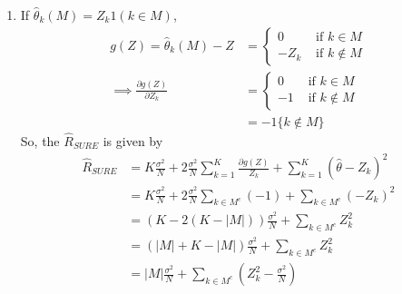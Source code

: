 \documentclass{article}[12pt]
\begin{document}
\begin{enumerate}
    \item If $\hat{\theta}_k(M) = Z_k 1 (k \in M)$,
    \begin{align*}
        g(Z) = \hat{\theta}_k(M) - Z &=
        \begin{cases}
            0 &\mbox{ if $k \in M$} \\
            -Z_k &\mbox{ if $k \notin M$}
        \end{cases}\\
        \implies \frac{\partial g(Z)}{\partial Z_k} &=
        \begin{cases}
            0 &\mbox{ if $k \in M$} \\
            -1 &\mbox{ if $k \notin M$}
        \end{cases} \\
        &= -1\{ k \notin M\}
    \end{align*}
    So, the $\hat{R}_{SURE}$ is given by
    \begin{align*}
        \hat{R}_{SURE} &= K \frac{\sigma^2}{N} + 2 \frac{\sigma^2}{N} \sum_{k=1}^K \frac{\partial g(Z)}{Z_k} + \sum_{k=1}^K (\hat{\theta}-Z_k)^2 \\
        &= K \frac{\sigma^2}{N} + 2 \frac{\sigma^2}{N} \sum_{k \in M^c} (-1) + \sum_{k \in M^c} (-Z_k)^2 \\
        &= (K - 2(K - |M|)) \frac{\sigma^2}{N} + \sum_{k \in M^c} Z_k^2 \\
        &= (|M| + K - |M|) \frac{\sigma^2}{N} + \sum_{k \in M^c} Z_k^2 \\
        &= |M| \frac{\sigma^2}{N} + \sum_{k \in M^c} (Z_k^2 - \frac{\sigma^2}{N})
    \end{align*}

\end{enumerate}
\end{document}
